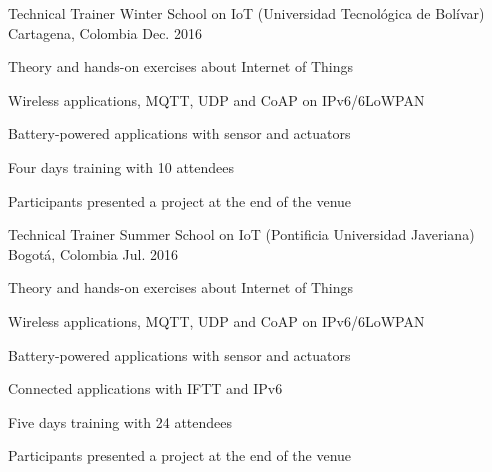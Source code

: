 

\begin{cventries}

  \cventry
    {Technical Trainer} %
    {Winter School on IoT (Universidad Tecnológica de Bolívar)} %
    {Cartagena, Colombia} %
    {Dec. 2016} %
    {
      \begin{cvitems} %
        \item {Theory and hands-on exercises about Internet of Things}
        \item {Wireless applications, MQTT, UDP and CoAP on IPv6/6LoWPAN}
        \item {Battery-powered applications with sensor and actuators}
        \item {Four days training with 10 attendees}
        \item {Participants presented a project at the end of the venue }
      \end{cvitems}
    }

  \cventry
    {Technical Trainer} %
    {Summer School on IoT (Pontificia Universidad Javeriana)} %
    {Bogotá, Colombia} %
    {Jul. 2016} %
    {
      \begin{cvitems} %
        \item {Theory and hands-on exercises about Internet of Things}
        \item {Wireless applications, MQTT, UDP and CoAP on IPv6/6LoWPAN}
        \item {Battery-powered applications with sensor and actuators}
        \item {Connected applications with IFTT and IPv6}
        \item {Five days training with 24 attendees}
        \item {Participants presented a project at the end of the venue }
      \end{cvitems}
    }


\end{cventries}

